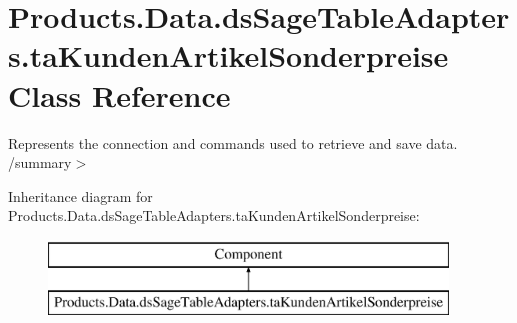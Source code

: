 \hypertarget{class_products_1_1_data_1_1ds_sage_table_adapters_1_1ta_kunden_artikel_sonderpreise}{}\section{Products.\+Data.\+ds\+Sage\+Table\+Adapters.\+ta\+Kunden\+Artikel\+Sonderpreise Class Reference}
\label{class_products_1_1_data_1_1ds_sage_table_adapters_1_1ta_kunden_artikel_sonderpreise}


Represents the connection and commands used to retrieve and save data. /summary$>$  


Inheritance diagram for Products.\+Data.\+ds\+Sage\+Table\+Adapters.\+ta\+Kunden\+Artikel\+Sonderpreise\+:\begin{figure}[H]
\begin{center}
\leavevmode
\includegraphics[height=2.000000cm]{class_products_1_1_data_1_1ds_sage_table_adapters_1_1ta_kunden_artikel_sonderpreise}
\end{center}
\end{figure}
